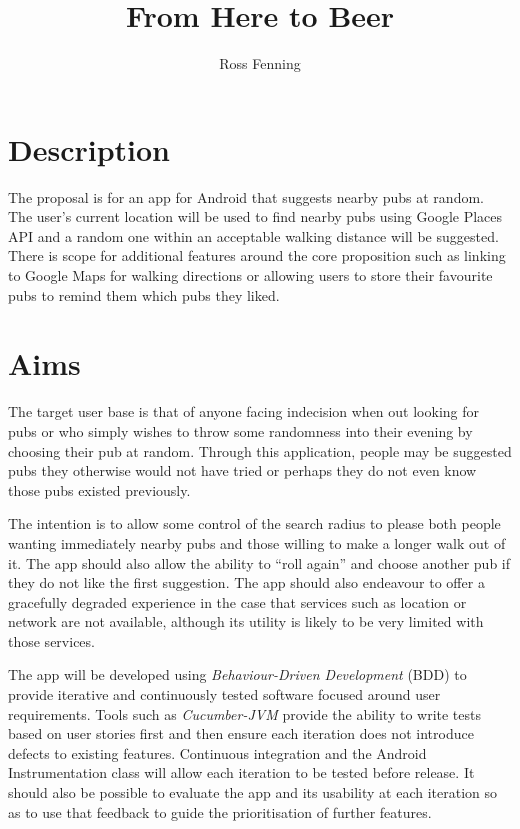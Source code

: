 \documentclass{article}
\title{From Here to Beer\\ \vspace{2 mm}{\large Android Assessment Proposal}}
\author{Ross Fenning}
\begin{document}
\maketitle

\section{Description}

The proposal is for an app for Android that suggests nearby pubs at random.
The user's current location will be used to find nearby pubs using Google
Places API and a random one within an acceptable walking distance will be
suggested. There is scope for additional features around the core proposition
such as linking to Google Maps for walking directions or allowing users
to store their favourite pubs to remind them which pubs they liked.

\section{Aims}

The target user base is that of anyone facing indecision when out looking for
pubs or who simply wishes to throw some randomness into their evening by
choosing their pub at random. Through this application, people may be suggested
pubs they otherwise would not have tried or perhaps they do not even know
those pubs existed previously.

The intention is to allow some control of the search radius to please both
people wanting immediately nearby pubs and those willing to make a longer
walk out of it. The app should also allow the ability to ``roll again'' and
choose another pub if they do not like the first suggestion.
The app should also endeavour to offer a gracefully degraded experience in
the case that services such as location or network are not available,
although its utility is likely to be very limited with those services.

The app will be developed using \emph{Behaviour-Driven Development} (BDD)
to provide
iterative and continuously tested software focused around user requirements.
Tools such as \emph{Cucumber-JVM} provide the ability to write tests based
on user stories first and then ensure each iteration does not introduce
defects to existing features. Continuous integration and the Android
Instrumentation class will allow each iteration to be tested before release.
It should also be possible to evaluate the app and its usability at each
iteration so as to use that feedback to guide the prioritisation of
further features.
\end{document}
